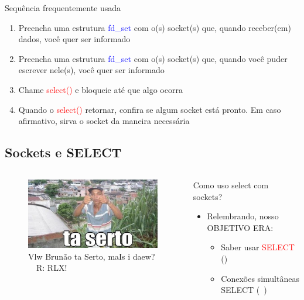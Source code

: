 \documentclass[10pt, xcolor=x11names]{beamer}
\begin{document}
\begin{frame} 

	\begin{block}{Sequência frequentemente usada}
	
		\begin{enumerate}[<+->]
			\item Preencha uma estrutura \textcolor{blue}{fd\_set} com o(s) socket(s) que, quando receber(em) dados, você quer ser informado
			\item Preencha uma estrutura \textcolor{blue}{fd\_set} com o(s) socket(s) que, quando você puder escrever nele(s), você quer ser informado
			\item Chame \textcolor{red}{select()} e bloqueie até que algo ocorra
			\item Quando o \textcolor{red}{select()} retornar, confira se algum socket está pronto. Em caso afirmativo, sirva o socket da maneira necessária
		\end{enumerate}

	\end{block}
	
\end{frame}

\subsection{Sockets e SELECT}

\begin{frame}
	\begin{columns}
			\begin{figure}
				\includegraphics[width=.8\linewidth]{img/taserto.png}
				\caption{Vlw Brunão ta Serto, maIs i daew? ~~R: RLX!}
			\end{figure}
		

		\begin{block}{Como uso select com sockets?}
			\begin{itemize}
				\item Relembrando, nosso OBJETIVO ERA:
					\begin{itemize}
						\item Saber usar \textcolor{red}{SELECT} (\checkmark)
						\item Conexões simultâneas SELECT (~)
					\end{itemize}
			\end{itemize}
		\end{block}
		
	\end{columns}
\end{frame}
\end{document}
